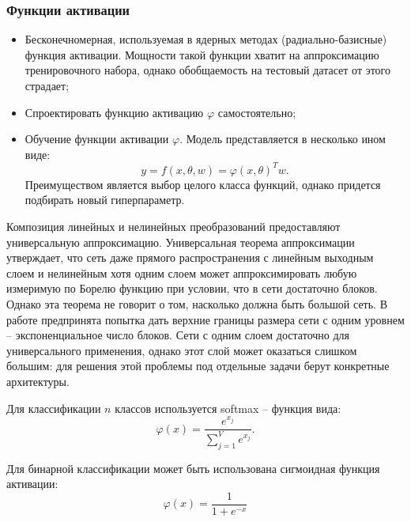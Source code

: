 \subsubsection{Функции активации}
\begin{itemize}
    \item Бесконечномерная, используемая в ядерных методах (радиально-базисные) функция активации. Мощности такой функции хватит на аппроксимацию тренировочного набора, однако обобщаемость на тестовый датасет от этого страдает;
    \item Спроектировать функцию активацию $\varphi$ самостоятельно;
    \item Обучение функции активации $\varphi$. Модель представляется в несколько ином виде:
    \[y = f(x, \theta, w) = \varphi(x, \theta)^Tw.\]
    Преимуществом является выбор целого класса функций, однако придется подбирать новый гиперпараметр.
\end{itemize}
\bigskip\par 
Композиция линейных и нелинейных преобразований предоставляют универсальную аппроксимацию. Универсальная теорема аппроксимации \cite{hornik} утверждает, что сеть даже прямого распространения с линейным выходным слоем и нелинейным хотя одним слоем может аппроксимировать любую измеримую по Борелю функцию при условии, что в сети достаточно блоков. Однако эта теорема не говорит о том, насколько должна быть большой сеть. В работе \cite{barron} предпринята попытка дать верхние границы размера сети с одним уровнем -- экспоненциальное число блоков. Сети с одним слоем достаточно для универсального применения, однако этот слой может оказаться слишком большим: для решения этой проблемы под отдельные задачи берут конкретные архитектуры.

\bigskip\par 
Для классификации $n$ классов используется softmax -- функция вида:
\[\varphi(x) = \dfrac{e^{x_j}}{\sum\limits_{j=1}^Ve^{x_j}}.\]
\par
Для бинарной классификации может быть использована сигмоидная функция активации:
\[\varphi(x) = \dfrac{1}{1+e^{-x}}\]

